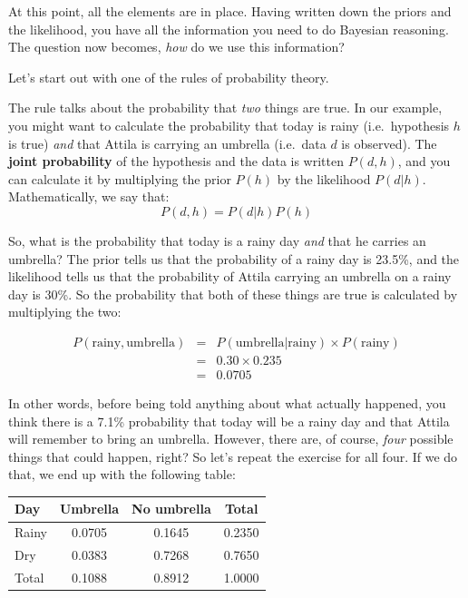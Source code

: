 \documentclass[
]{book}
\theoremstyle{definition}
\theoremstyle{definition}
\theoremstyle{definition}
\theoremstyle{definition}
\theoremstyle{remark}
\begin{document}
At this point, all the elements are in place. Having written down the priors and the likelihood, you have all the information you need to do Bayesian reasoning. The question now becomes, \emph{how} do we use this information?

Let's start out with one of the rules of probability theory.

The rule talks about the probability that \emph{two} things are true. In our example, you might want to calculate the probability that today is rainy (i.e.~hypothesis \(h\) is true) \emph{and} that Attila is carrying an umbrella (i.e.~data \(d\) is observed). The \textbf{joint probability} of the hypothesis and the data is written \(P(d,h)\), and you can calculate it by multiplying the prior \(P(h)\) by the likelihood \(P(d|h)\). Mathematically, we say that:
\[
P(d,h) = P(d|h) P(h)
\]

So, what is the probability that today is a rainy day \emph{and} that he carries an umbrella? The prior tells us that the probability of a rainy day is 23.5\%, and the likelihood tells us that the probability of Attila carrying an umbrella on a rainy day is 30\%. So the probability that both of these things are true is calculated by multiplying the two:

\[
\begin{array}{rcl}
P(\mbox{rainy}, \mbox{umbrella}) & = & P(\mbox{umbrella} | \mbox{rainy}) \times P(\mbox{rainy}) \\
& = & 0.30 \times 0.235 \\
& = & 0.0705
\end{array}
\]

In other words, before being told anything about what actually happened, you think there is a 7.1\% probability that today will be a rainy day and that Attila will remember to bring an umbrella. However, there are, of course, \emph{four} possible things that could happen, right? So let's repeat the exercise for all four. If we do that, we end up with the following table:

\begin{longtable}[]{@{}lccc@{}}
\toprule()
Day & Umbrella & No umbrella & Total \\
\midrule()
\endhead
Rainy & 0.0705 & 0.1645 & 0.2350 \\
Dry & 0.0383 & 0.7268 & 0.7650 \\
Total & 0.1088 & 0.8912 & 1.0000 \\
\bottomrule()
\end{longtable}
\end{document}
